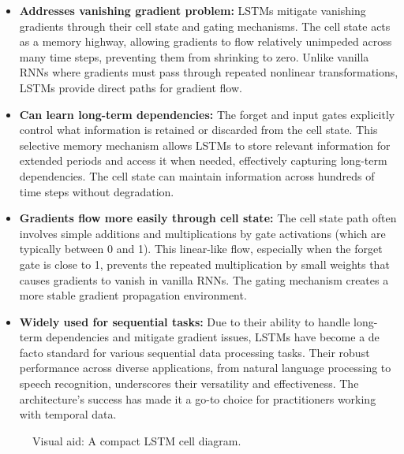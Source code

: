 \begin{itemize}
    \item \textbf{Addresses vanishing gradient problem:} LSTMs mitigate vanishing gradients through their cell state and gating mechanisms. The cell state acts as a memory highway, allowing gradients to flow relatively unimpeded across many time steps, preventing them from shrinking to zero. Unlike vanilla RNNs where gradients must pass through repeated nonlinear transformations, LSTMs provide direct paths for gradient flow.
    
    \item \textbf{Can learn long-term dependencies:} The forget and input gates explicitly control what information is retained or discarded from the cell state. This selective memory mechanism allows LSTMs to store relevant information for extended periods and access it when needed, effectively capturing long-term dependencies. The cell state can maintain information across hundreds of time steps without degradation.
    
    \item \textbf{Gradients flow more easily through cell state:} The cell state path often involves simple additions and multiplications by gate activations (which are typically between 0 and 1). This linear-like flow, especially when the forget gate is close to 1, prevents the repeated multiplication by small weights that causes gradients to vanish in vanilla RNNs. The gating mechanism creates a more stable gradient propagation environment.
    
    \item \textbf{Widely used for sequential tasks:} Due to their ability to handle long-term dependencies and mitigate gradient issues, LSTMs have become a de facto standard for various sequential data processing tasks. Their robust performance across diverse applications, from natural language processing to speech recognition, underscores their versatility and effectiveness. The architecture's success has made it a go-to choice for practitioners working with temporal data.
\end{itemize}

\begin{figure}[h]
    \centering
    \caption{Visual aid: A compact LSTM cell diagram.}
    \label{fig:lstm_cell_diagram}
\end{figure}

